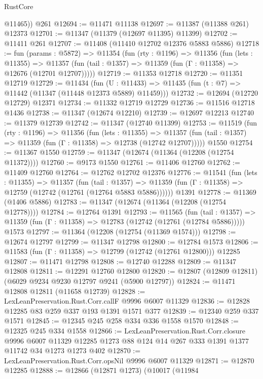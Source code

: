 \begin{lexlean}{RustCore}
\begin{coremodule}
        @11465))
    @261
@12694 := @11471 @11138
@12697 := @11387 (@11388 @261) @12373
@12701 := @11347 (@11379 (@12697 @11395) @11399)
@12702 := @11411 @261
@12707 := @11408 (@11410 @12702 @12376 @5883 @5886)
@12718 := fun (params : @5872) =>
  @11354
    (fun (rty : @1196) =>
    @11356
      (fun (lets : @11355) =>
      @11357 (fun (tail : @1357) => @11359 (fun (Γ : @11358) => @12676 (@12701 @12707)))))
@12719 := @11353 @12718
@12720 := @11351 @12719
@12729 := @11434
    (fun (U : @11433) => @11435 (fun (t : @7) => @11442 (@11347 (@11448 @12373 @5889) @11459)))
@12732 := @12694 (@12720 @12729) @12371
@12734 := @11332 @12719 @12729
@12736 := @11516 @12718 @1436
@12738 := @11347 (@12674 @12210)
@12739 := @12697 @12213
@12740 := @11379 @12739
@12742 := @11347 (@12740 @11399)
@12753 := @11519
    (fun (rty : @1196) =>
    @11356
      (fun (lets : @11355) =>
      @11357 (fun (tail : @1357) => @11359 (fun (Γ : @11358) => @12738 (@12742 @12707)))))
    @1550
@12754 := @11367 @1550
@12759 := @11347 (@12674 (@11364 (@12208 (@12754 @11372))))
@12760 := @9173 @1550
@12761 := @11406 @12760
@12762 := @11409 @12760
@12764 := @12762 @12702 @12376
@12776 := @11541
    (fun (lets : @11355) =>
    @11357
      (fun (tail : @1357) =>
      @11359 (fun (Γ : @11358) => @12759 (@12742 (@12761 (@12764 @5883 @5886))))))
    @1391
@12778 := @11369 (@1406 @5886)
@12783 := @11347 (@12674 (@11364 (@12208 (@12754 @12778))))
@12784 := @12764 @1391
@12793 := @11565
    (fun (tail : @1357) => @11359 (fun (Γ : @11358) => @12783 (@12742 (@12761 (@12784 @5886)))))
    @1573
@12797 := @11364 (@12208 (@12754 (@11369 @1574)))
@12798 := @12674 @12797
@12799 := @11347 @12798
@12800 := @12784 @1573
@12806 := @11583 (fun (Γ : @11358) => @12799 (@12742 (@12761 @12800))) @12285
@12807 := @11471 @12798
@12808 := @12740 @12288
@12809 := @11347 @12808
@12811 := @12291 @12760 @12800
@12820 := @12807 (@12809 @12811) (@6029 @9234 @9230 @12797 @9241 (@5900 @12797))
@12824 := @11471 @12808 @12811 (@11658 @12739)
@12828 := LexLeanPreservation.Rust.Corr.callF @9996 @6007 @11329
@12836 := @12828 @12285 @83 @259 @337 @193 @1391 @1571 @377
@12839 := @12340 @259 @337 @1571
@12845 := @12345 @245 @258 @334 @336 @1558 @1570
@12848 := @12325 @245 @334 @1558
@12866 := LexLeanPreservation.Rust.Corr.closure
    @9996
    @6007
    @11329
    @12285
    @1273
    @88
    @124
    @14
    @267
    @333
    @1391
    @1377
    @11742
    @34
    @1273
    @1273
    @402
@12870 := LexLeanPreservation.Rust.Corr.opsNil @9996 @6007 @11329
@12871 := @12870 @12285
@12888 := @12866
    (@12871 @1273)
    (@10017
      (@11984

\end{coremodule}
\end{lexlean}
